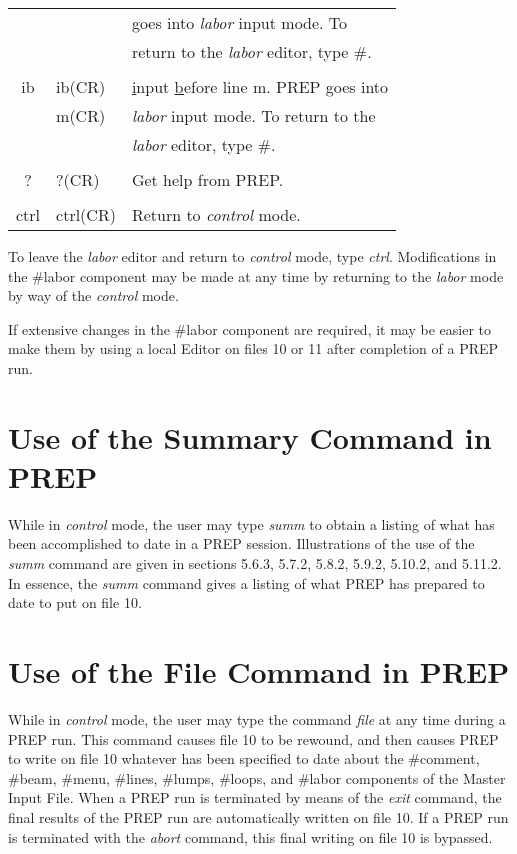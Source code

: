 \begin{table}
\begin{center}
\begin{tabular}{|c|l|l|}
         &             & goes into {\em labor} input mode.  To \\
         &             & return to the {\em labor} editor, type \#. \\
         &             & \\
   ib    &   ib(CR)    & {\underline i}nput {\underline b}efore line m. PREP goes into\\
         &   m(CR)     & {\em labor} input mode.  To return to the \\
         &             & {\em labor} editor, type \#. \\
         &             & \\
    ?    &   ?(CR)     & Get help from PREP. \\
         &             & \\
  ctrl   &   ctrl(CR)  & Return to {\em control} mode. \\ \hline
\end{tabular}
\end{center}
\end{table}

     To leave the {\em labor} editor and return to {\em control} mode,
type {\em ctrl}.
Modifications in the \#labor component may be made at any time by returning
to the {\em labor} mode by way of the {\em control} mode.

     If extensive changes in the \#labor component are required, it may be
easier to make them by using a local Editor on files 10 or 11 after
completion of a PREP run.

\section{Use of the Summary Command in PREP}
     While in {\em control} mode, the user may type {\em summ} to obtain a listing of
what has been accomplished to date in a PREP session.  Illustrations of the
use of the {\em summ} command are given in sections 5.6.3, 5.7.2, 5.8.2, 5.9.2,
5.10.2, and 5.11.2.  In essence, the {\em summ} command gives a listing of what
PREP has prepared to date to put on file 10.

\section{Use of the File Command in PREP}
     While in {\em control} mode, the user may type the command {\em file} at any time
during a PREP run.  This command causes file 10 to be rewound, and then
causes PREP to write on file 10 whatever has been specified to date about
the \#comment, \#beam, \#menu, \#lines, \#lumps, \#loops, and \#labor components
of the Master Input File.  When a PREP run is terminated by means of the
{\em exit} command, the final results of the PREP run are automatically written
on file 10.  If a PREP run is terminated with the {\em abort} command, this final
writing on file 10 is bypassed.

